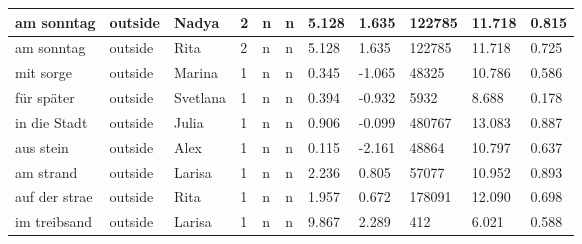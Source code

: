 \begin{longtable}{|p{4cm}|p{1cm}|p{1.2cm}|p{0.5cm}|p{0.5cm}|p{0.5cm}|R{1cm}|R{1cm}|R{1cm}|R{1cm}|R{1cm}|}
am sonntag                 & outside           & Nadya         & 2                                   & n                          & n                          & 5.128      & 1.635         & 122785                  & 11.718                        & 0.815                   \\ \hline
am sonntag                 & outside           & Rita          & 2                                   & n                          & n                          & 5.128      & 1.635         & 122785                  & 11.718                        & 0.725                   \\ \hline
mit sorge                  & outside           & Marina        & 1                                   & n                          & n                          & 0.345      & -1.065        & 48325                   & 10.786                        & 0.586                   \\ \hline
f\"{u}r sp\"{a}ter         & outside           & Svetlana      & 1                                   & n                          & n                          & 0.394      & -0.932        & 5932                    & 8.688                         & 0.178                   \\ \hline
in die Stadt               & outside           & Julia         & 1                                   & n                          & n                          & 0.906      & -0.099        & 480767                  & 13.083                        & 0.887                   \\ \hline
aus stein                  & outside           & Alex          & 1                                   & n                          & n                          & 0.115      & -2.161        & 48864                   & 10.797                        & 0.637                   \\ \hline
am strand                  & outside           & Larisa        & 1                                   & n                          & n                          & 2.236      & 0.805         & 57077                   & 10.952                        & 0.893                   \\ \hline
auf der strae         & outside           & Rita          & 1                                   & n                          & n                          & 1.957      & 0.672         & 178091                  & 12.090                        & 0.698                   \\ \hline
im treibsand               & outside           & Larisa        & 1                                   & n                          & n                          & 9.867      & 2.289         & 412                     & 6.021                         & 0.588                   \\ \hline

\end{longtable}
